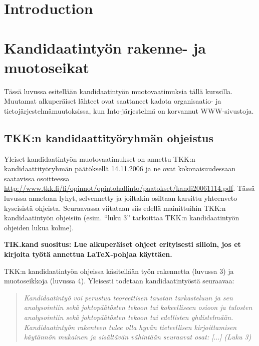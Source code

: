 
\section{Introduction}




\section{Kandidaatintyön rakenne- ja muotoseikat}
\label{sec:esimluku}

Tässä luvussa esitellään kandidaatintyön muotovaatimuksia
tällä kurssilla. Muutamat alkuperäiset lähteet ovat saattaneet
kadota organisaatio- ja tietojärjestelmämuutoksissa, kun
Into-järjestelmä on korvannut WWW-sivustoja.

\subsection{TKK:n kandidaattityöryhmän ohjeistus}

Yleiset kandidaatintyön muotovaatimukset on annettu TKK:n
kandidaattityöryhmän päätöksellä 14.11.2006 ja ne ovat
kokonaisuudessaan saatavissa osoitteessa
\url{http://www.tkk.fi/fi/opinnot/opintohallinto/paatokset/kandi20061114.pdf}.
Tässä luvussa annetaan lyhyt, selvennetty ja joiltakin osiltaan
karsittu yhteenveto kyseisistä ohjeista. Seuraavassa viitataan siis
edellä mainittuihin TKK:n kandidaatintyön ohjeisiin (esim. ``luku 3''
tarkoittaa TKK:n kandidaatintyön ohjeiden lukua kolme).

\textbf{TIK.kand suositus: Lue alkuperäiset ohjeet erityisesti
  silloin, jos et kirjoita työtä annettua \LaTeX{}-pohjaa käyttäen.}

TKK:n kandidaatintyön ohjeissa käsitellään työn rakennetta (luvussa 3)
ja muotoseikkoja (luvussa 4). Yleisesti todetaan kandidaatintyöstä
seuraavaa:
%
\begin{quotation}
\noindent \it
Kandidaatintyö voi perustua teoreettisen taustan tarkasteluun 
ja sen analysointiin sekä johtopäätösten tekoon tai kokeelliseen osioon ja 
tulosten analysointiin sekä johtopäätösten tekoon
tai edellisten yhdistelmään.
Kandidaatintyön rakenteen tulee olla hyvän tieteellisen kirjoittamisen 
käytännön mukainen
ja sisältävän vähintään seuraavat osat: [$\ldots$] (Luku 3)
\end{quotation}

